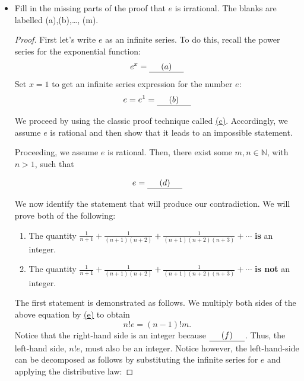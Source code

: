 \documentclass[11pt]{article}
\newcounter{tasknumb}
\newcommand{\tasknumb}[1]{\refstepcounter{tasknumb}\textmd{\textbf{$\fbox{$\fbox{Task \thetasknumb}$}$}}#1}
\newenvironment{task}[1][]%
 {\begin{itemize}
 \item[\tasknumb{#1}]  }
{
    \end{itemize}    }%
\begin{document}
\begin{task}

Fill in the missing parts of the proof that $e$ is irrational.  The blanks are labelled (a),(b),\ldots , (m).
\vspace*{.2in}

\begin{proof} First let's write $e$ as an infinite series.  To do this, recall the power series for the exponential function:  $$ e^x = \underline{\hspace*{.2in}(a)\hspace*{.2in}}$$ Set $x=1$ to get an infinite series expression for the number $e$: $$ e=e^1= \underline{\hspace*{.2in}(b)\hspace*{.2in}}$$

We proceed by using the classic proof technique called \underline{\hspace*{.2in}(c)\hspace*{.2in}}. Accordingly, we assume $e$ is rational and then show that it leads to an impossible statement.

Proceeding, we assume $e$ is rational.  Then, there exist some $m,n \in \mathbb{N}$, with $n>1$, such that

$$ e = \underline{\hspace*{.2in}(d)\hspace*{.2in}} $$

We now identify the statement that will produce our contradiction.  We will prove both of the following:

\begin{enumerate}
    \item The quantity $\frac{1}{n+1}+\frac{1}{(n+1)(n+2)}+\frac{1}{(n+1)(n+2)(n+3)}+\cdots$ {\bf is} an integer.
    \item The quantity $\frac{1}{n+1}+\frac{1}{(n+1)(n+2)}+\frac{1}{(n+1)(n+2)(n+3)}+\cdots$ {\bf is not} an integer.
\end{enumerate}

The first statement is demonstrated as follows.  We multiply both sides of the above equation by \underline{\hspace*{.2in}(e)\hspace*{.2in}} to obtain $$ n!e=(n-1)!m.  $$  Notice that the right-hand side is an integer because $\underline{\hspace*{.2in}(f)\hspace*{.2in}}$.  Thus, the left-hand side, $n!e$, must also be an integer.  Notice however, the left-hand-side can be decomposed as follows by substituting the infinite series for $e$ and applying the distributive law:


\end{proof}
\end{task}
\end{document}
